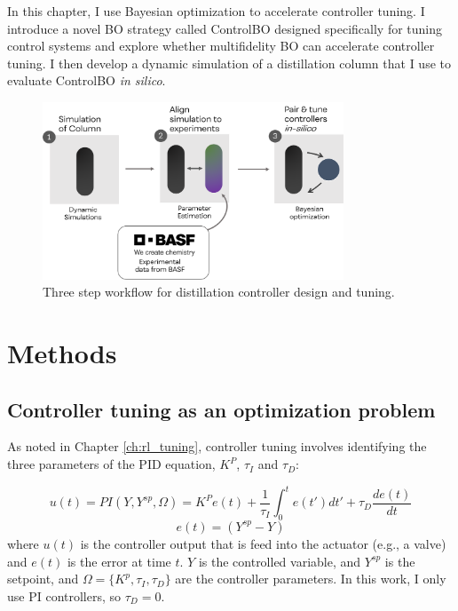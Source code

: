 In this chapter, I use Bayesian optimization to accelerate controller tuning. I introduce a novel BO strategy called ControlBO designed specifically for tuning control systems and explore whether multifidelity BO can accelerate controller tuning. I then develop a dynamic simulation of a distillation column that I use to evaluate ControlBO \textit{in silico}.

\begin{figure}
    \centering
    \includegraphics[width=0.8\textwidth]{gfx/Chapter06/tuning_workflow.png}
    \caption{Three step workflow for distillation controller design and tuning.}
    \label{fig:tuning_workflow}
\end{figure}

\section{Methods}

\subsection{Controller tuning as an optimization problem}

As noted in Chapter \ref{ch:rl_tuning}, controller tuning involves identifying the three parameters of the PID equation, $K^P$, $\tau_I$ and $\tau_D$:

\begin{equation}
    u(t) = PI(Y, Y^{sp}, \Omega) =  K^P e(t) + \frac{1}{\tau_I}\int_0^t e(t')dt' + \tau_D \frac{de(t)}{dt}
\end{equation}
\begin{equation}
    e(t) = (Y^{sp} - Y)
\end{equation}
where $u(t)$ is the controller output that is feed into the actuator (e.g., a valve) and $e(t)$ is the error at time $t$. $Y$ is the controlled variable, and $Y^{sp}$ is the setpoint, and $\Omega=\{K^p, \tau_I, \tau_D \}$ are the controller parameters. In this work, I only use PI controllers, so $\tau_D=0$.

